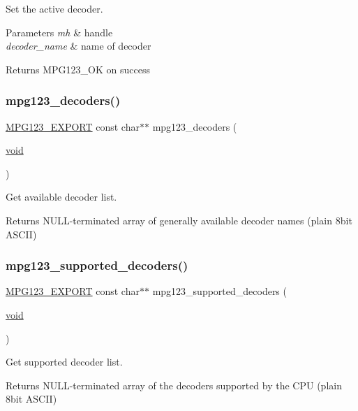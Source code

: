 Set the active decoder. 
\begin{DoxyParams}{Parameters}
{\em mh} & handle \\
\hline
{\em decoder\+\_\+name} & name of decoder \\
\hline
\end{DoxyParams}
\begin{DoxyReturn}{Returns}
M\+P\+G123\+\_\+\+OK on success 
\end{DoxyReturn}
\mbox{\label{group__mpg123__decoder_gaaa1b0af58f5f9654c736ccb24dcf0475}} 
\subsubsection{\texorpdfstring{mpg123\_decoders()}{mpg123\_decoders()}}
{\footnotesize\ttfamily \mbox{\hyperlink{mpg123_8h_a2ba98cfba3f760879df70e755b2a61cc}{M\+P\+G123\+\_\+\+E\+X\+P\+O\+RT}} const char$\ast$$\ast$ mpg123\+\_\+decoders (\begin{DoxyParamCaption}\item[{\mbox{\hyperlink{_s_d_l__opengles2__gl2ext_8h_ae5d8fa23ad07c48bb609509eae494c95}{void}}}]{ }\end{DoxyParamCaption})}

Get available decoder list. \begin{DoxyReturn}{Returns}
N\+U\+L\+L-\/terminated array of generally available decoder names (plain 8bit A\+S\+C\+II) 
\end{DoxyReturn}
\mbox{\label{group__mpg123__decoder_gaa74de136a5a49d0b420707e98e91a789}} 
\subsubsection{\texorpdfstring{mpg123\_supported\_decoders()}{mpg123\_supported\_decoders()}}
{\footnotesize\ttfamily \mbox{\hyperlink{mpg123_8h_a2ba98cfba3f760879df70e755b2a61cc}{M\+P\+G123\+\_\+\+E\+X\+P\+O\+RT}} const char$\ast$$\ast$ mpg123\+\_\+supported\+\_\+decoders (\begin{DoxyParamCaption}\item[{\mbox{\hyperlink{_s_d_l__opengles2__gl2ext_8h_ae5d8fa23ad07c48bb609509eae494c95}{void}}}]{ }\end{DoxyParamCaption})}

Get supported decoder list. \begin{DoxyReturn}{Returns}
N\+U\+L\+L-\/terminated array of the decoders supported by the C\+PU (plain 8bit A\+S\+C\+II) 
\end{DoxyReturn}
